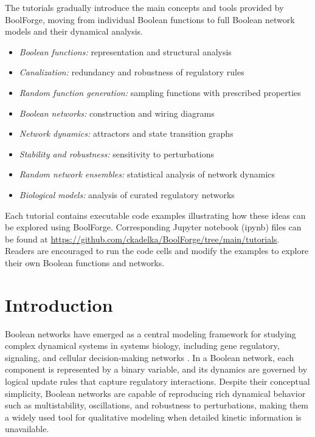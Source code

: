 \documentclass[
]{article}
\providecommand{\tightlist}{%
  \setlength{\itemsep}{0pt}\setlength{\parskip}{0pt}}
\begin{document}
The tutorials gradually introduce the main concepts and tools provided
by BoolForge, moving from individual Boolean functions to full Boolean
network models and their dynamical analysis.

\begin{itemize}
\tightlist
\item
  \emph{Boolean functions:} representation and structural analysis
\item
  \emph{Canalization:} redundancy and robustness of regulatory rules
\item
  \emph{Random function generation:} sampling functions with prescribed
  properties
\item
  \emph{Boolean networks:} construction and wiring diagrams
\item
  \emph{Network dynamics:} attractors and state transition graphs
\item
  \emph{Stability and robustness:} sensitivity to perturbations
\item
  \emph{Random network ensembles:} statistical analysis of network
  dynamics
\item
  \emph{Biological models:} analysis of curated regulatory networks
\end{itemize}

Each tutorial contains executable code examples illustrating how these
ideas can be explored using BoolForge. Corresponding Jupyter notebook
(ipynb) files can be found at
\url{https://github.com/ckadelka/BoolForge/tree/main/tutorials}. Readers
are encouraged to run the code cells and modify the examples to explore
their own Boolean functions and networks.

\section*{Introduction}\label{introduction}

Boolean networks have emerged as a central modeling framework for
studying complex dynamical systems in systems biology, including gene
regulatory, signaling, and cellular decision-making networks
\citep{kauffman1969metabolic}. In a Boolean network, each component is
represented by a binary variable, and its dynamics are governed by
logical update rules that capture regulatory interactions. Despite their
conceptual simplicity, Boolean networks are capable of reproducing rich
dynamical behavior such as multistability, oscillations, and robustness
to perturbations, making them a widely used tool for qualitative
modeling when detailed kinetic information is unavailable.
\end{document}
